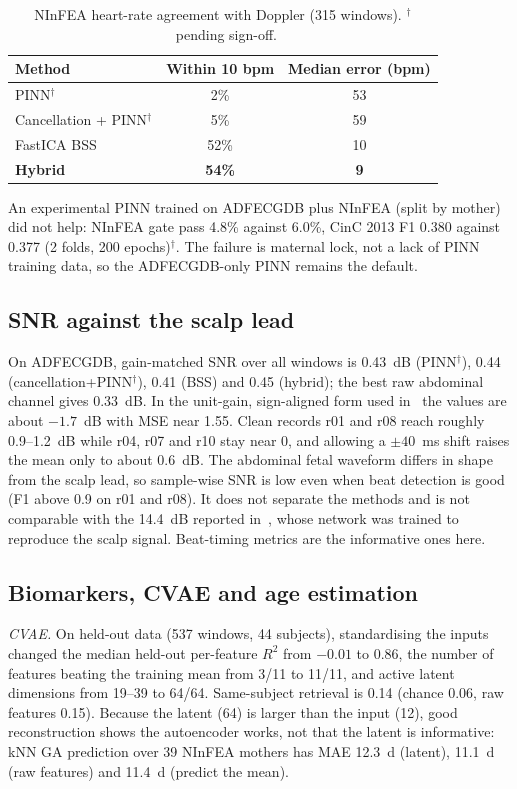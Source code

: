 \documentclass[journal]{IEEEtran}
\newcommand{\pinn}{$^{\dagger}$}
\begin{document}
\begin{table}[!t]
\caption{NInFEA heart-rate agreement with Doppler (315 windows). \pinn~pending sign-off.}
\label{tab:doppler}
\centering
\small
\begin{tabular}{@{}lcc@{}}
\toprule
Method & Within 10 bpm & Median error (bpm) \\
\midrule
PINN\pinn & 2\% & 53 \\
Cancellation + PINN\pinn & 5\% & 59 \\
FastICA BSS & 52\% & 10 \\
\textbf{Hybrid} & \textbf{54\%} & \textbf{9} \\
\bottomrule
\end{tabular}
\end{table}

An experimental PINN trained on ADFECGDB plus NInFEA (split by mother) did not help: NInFEA gate pass 4.8\% against 6.0\%, CinC 2013 F1 0.380 against 0.377 (2 folds, 200 epochs)\pinn. The failure is maternal lock, not a lack of PINN training data, so the ADFECGDB-only PINN remains the default.

\subsection{SNR against the scalp lead}
On ADFECGDB, gain-matched SNR over all windows is 0.43~dB (PINN\pinn), 0.44 (cancellation+PINN\pinn), 0.41 (BSS) and 0.45 (hybrid); the best raw abdominal channel gives 0.33~dB. In the unit-gain, sign-aligned form used in~\cite{muthukumar2026icc} the values are about $-1.7$~dB with MSE near 1.55. Clean records r01 and r08 reach roughly 0.9--1.2~dB while r04, r07 and r10 stay near 0, and allowing a $\pm40$~ms shift raises the mean only to about 0.6~dB. The abdominal fetal waveform differs in shape from the scalp lead, so sample-wise SNR is low even when beat detection is good (F1 above 0.9 on r01 and r08). It does not separate the methods and is not comparable with the 14.4~dB reported in~\cite{muthukumar2026icc}, whose network was trained to reproduce the scalp signal. Beat-timing metrics are the informative ones here.

\subsection{Biomarkers, CVAE and age estimation}
\emph{CVAE.} On held-out data (537 windows, 44 subjects), standardising the inputs changed the median held-out per-feature $R^{2}$ from $-0.01$ to 0.86, the number of features beating the training mean from 3/11 to 11/11, and active latent dimensions from 19--39 to 64/64. Same-subject retrieval is 0.14 (chance 0.06, raw features 0.15). Because the latent (64) is larger than the input (12), good reconstruction shows the autoencoder works, not that the latent is informative: kNN GA prediction over 39 NInFEA mothers has MAE 12.3~d (latent), 11.1~d (raw features) and 11.4~d (predict the mean).
\end{document}
